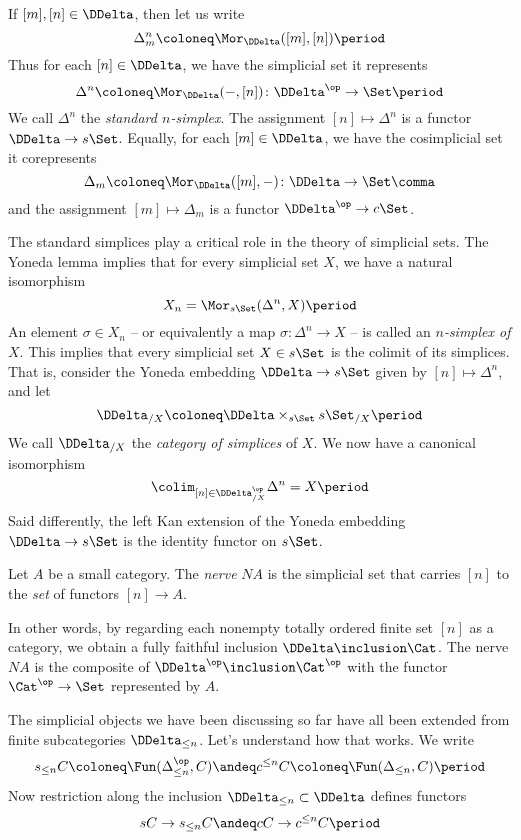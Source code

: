 \begin{eg}
  If $[m], [n] \in \DDelta$, then let us write
  \[
    \Delta_m^n \coloneq \Mor_{\DDelta}([m],[n]) \period
  \]
  Thus for each $[n] \in \DDelta$, we have the simplicial set it represents
  \[
    \Delta^n \coloneq \Mor_{\DDelta}(-,[n]) \colon \DDelta^{\op} \to \Set \period
  \]
  We call $\Delta^n$ the \emph{standard $n$-simplex}.
  The assignment $[n] \mapsto \Delta^n$ is a functor $\DDelta \to s\Set$.
  Equally, for each $[m] \in \DDelta$, we have the cosimplicial set it corepresents
  \[
    \Delta_m \coloneq \Mor_{\DDelta}([m],-) \colon \DDelta \to \Set \comma
  \]
  and the assignment $[m] \mapsto \Delta_m$ is a functor $\DDelta^{\op} \to c\Set$.
\end{eg}

The standard simplices play a critical role in the theory of simplicial sets.
The Yoneda lemma implies that for every simplicial set $X$, we have a natural isomorphism
\[
  X_n = \Mor_{s\Set}(\Delta^n, X) \period
\]
An element $\sigma \in X_n$ -- or equivalently a map $\sigma \colon \Delta^n \to X$ -- is called an \emph{$n$-simplex of $X$}.
This implies that every simplicial set $X \in s\Set$ is the colimit of its simplices.
That is, consider the Yoneda embedding $\DDelta \to s\Set$ given by $[n] \mapsto \Delta^n$, and let
\[
  \DDelta_{/X} \coloneq \DDelta \times_{s\Set} s\Set_{/X} \period
\]
We call $\DDelta_{/X}$ the \emph{category of simplices} of $X$.
We now have a canonical isomorphism
\[
  \colim_{[n]\in\DDelta_{/X}^{\op}} \Delta^n = X \period
\]
Said differently, the left Kan extension of the Yoneda embedding $\DDelta \to s\Set$ is the identity functor on $s\Set$. 

\begin{eg}
  Let $A$ be a small category.
  The \emph{nerve} $NA$ is the simplicial set that carries $[n]$ to the \emph{set} of functors $[n] \to A$.

  In other words, by regarding each nonempty totally ordered finite set $[n]$ as a category, we obtain a fully faithful inclusion $\DDelta \inclusion \Cat$.
  The nerve $NA$ is the composite of $\DDelta^{\op} \inclusion \Cat^{\op}$ with the functor $\Cat^{\op} \to \Set$ represented by $A$.
\end{eg}

The simplicial objects we have been discussing so far have all been extended from finite subcategories $\DDelta_{\leq n}$.
Let's understand how that works.
We write
\[
  s_{\leq n}C \coloneq \Fun(\Delta_{\leq n}^{\op}, C)
  \andeq
  c^{\leq n}C \coloneq \Fun(\Delta_{\leq n}, C)
  \period
\]
Now restriction along the inclusion $\DDelta_{\leq n} \subset \DDelta$ defines functors
\[
  sC \to s_{\leq n}C
  \andeq
  cC \to c^{\leq n}C \period
\]

